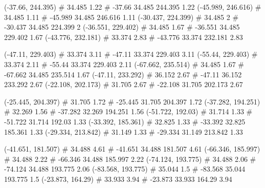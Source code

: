 \documentclass[a4paper,openbib,10pt]{article}
\newenvironment{treegraph}{\begin{graph}}{\end{graph}}
\begin{document}
\begin{treegraph}
  (-37.66, 244.395) #     34.485    1.22
   #    -37.66    34.485    244.395    1.22
  (-45.989, 246.616) #     34.485    1.11
   #    -45.989    34.485    246.616    1.11
  (-30.437, 224.399) #     34.485    2
   #    -30.437    34.485    224.399    2
  (-36.551, 229.402) #     34.485    1.67
   #    -36.551    34.485    229.402    1.67
  (-43.776, 232.181) #     33.374    2.83
   #    -43.776    33.374    232.181    2.83

  (-47.11, 229.403) #     33.374    3.11
   #    -47.11    33.374    229.403    3.11
  (-55.44, 229.403) #     33.374    2.11
   #    -55.44    33.374    229.403    2.11
  (-67.662, 235.514) #     34.485    1.67
   #    -67.662    34.485    235.514    1.67
  (-47.11, 233.292) #     36.152    2.67
   #    -47.11    36.152    233.292    2.67
  (-22.108, 202.173) #     31.705    2.67
   #    -22.108    31.705    202.173    2.67

  (-25.445, 204.397) #     31.705    1.72
   #    -25.445    31.705    204.397    1.72
  (-37.282, 194.251) #     32.269    1.56
   #    -37.282    32.269    194.251    1.56
  (-51.722, 192.03) #     31.714    1.33
   #    -51.722    31.714    192.03    1.33
  (-33.392, 185.361) #     32.825    1.33
   #    -33.392    32.825    185.361    1.33
  (-29.334, 213.842) #     31.149    1.33
   #    -29.334    31.149    213.842    1.33

  (-41.651, 181.507) #     34.488    4.61
   #    -41.651    34.488    181.507    4.61
  (-66.346, 185.997) #     34.488    2.22
   #    -66.346    34.488    185.997    2.22
  (-74.124, 193.775) #     34.488    2.06
   #    -74.124    34.488    193.775    2.06
  (-83.568, 193.775) #     35.044    1.5
   #    -83.568    35.044    193.775    1.5
  (-23.873, 164.29) #     33.933    3.94
   #    -23.873    33.933    164.29    3.94


\end{treegraph}
\end{document}
